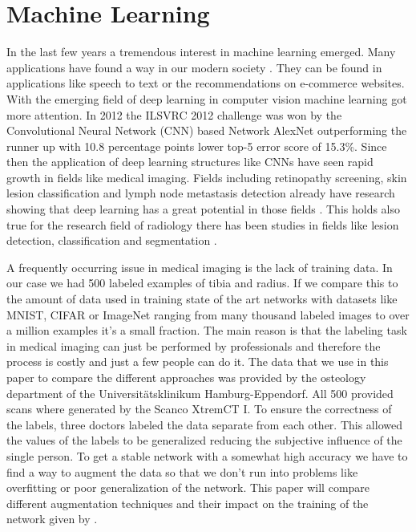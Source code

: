 \documentclass[
a4paper, 
12pt,
grayscalebody, %
abstract=on,
twoside, BCOR10mm, 12pt, DIV13,headinclude, footexclude, final, abstracton, openright
]{ibireprt}
\numberwithin{equation}{chapter}
\numberwithin{table}{chapter}
\numberwithin{figure}{chapter}
\numberwithin{algorithm}{chapter}
\numberwithin{example}{chapter}
\numberwithin{example}{chapter}
\begin{document}
\section{Machine Learning}
In the last few years a tremendous interest in machine learning emerged. Many applications have found a way in our modern society \cite{LeCun2015}. They can be found in applications like speech to text or the recommendations on e-commerce websites.
With the emerging field of deep learning in computer vision machine learning got more attention. In 2012 the ILSVRC 2012 challenge  was won by the Convolutional Neural Network (CNN) based Network AlexNet outperforming the runner up with 10.8 percentage points lower top-5 error score of 15.3\%. Since then the application of deep learning structures like CNNs have seen rapid growth in fields like medical imaging. Fields including retinopathy screening, skin lesion classification and lymph node metastasis detection already have research showing that deep learning has a great potential in those fields . This holds also true for the research field of radiology there has been studies in fields like lesion detection, classification and segmentation \cite{Yamashita2018}.

A frequently occurring issue in medical imaging is the lack of training data. In our case we had 500 labeled examples of tibia and radius. If we compare this to the amount of data used in training state of the art networks with datasets like MNIST, CIFAR or ImageNet ranging from many thousand labeled images to over a million examples it's a small fraction. The main reason is that the labeling task in medical imaging can just be performed by professionals and therefore the process is costly and just a few people can do it.
The data that we use in this paper to compare the different approaches was provided by the osteology department of the Universitätsklinikum Hamburg-Eppendorf. All 500 provided scans where generated by the Scanco XtremCT I.
To ensure the correctness of the labels, three doctors labeled the data separate from each other. This allowed the values of the labels to be generalized reducing the subjective influence of the single person. To get a stable network with a somewhat high accuracy we have to find a way to augment the data so that we don't run into problems like overfitting or poor generalization of the network. This paper will compare different augmentation techniques and their impact on the training of the network given by \cite{Walle2023}. 

 
\end{document}
